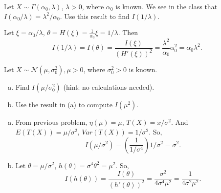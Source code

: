 \begin{ex}
    Let $X\sim \Gamma(\alpha_0, \lambda)$, $\lambda>0$, where $\alpha_0$ is known. We see in the class that $I(\alpha_0/\lambda)=\lambda^2/\alpha_0$. Use this result to find $I(1/\lambda)$. 
\end{ex}

\begin{solution}
    Let $\xi=\alpha_0/\lambda$, $\theta=H(\xi)=\frac{1}{\alpha_0}\xi=1/\lambda$. Then
    \[
        I(1/\lambda)=I(\theta)=\frac{I(\xi)}{(H'(\xi))^2}=\frac{\lambda^2}{\alpha_0}\alpha_0^2=\alpha_0\lambda^2. 
    \]
\end{solution}

\begin{ex}
    Let \(X \sim \mathcal{N}\left(\mu, \sigma_{0}^{2}\right), \mu>0\), where \(\sigma_{0}^{2}>0\) is known. 
    \begin{enumerate}[(a)]
        \item Find \(I\left(\mu / \sigma_{0}^{2}\right)\) (hint: no calculations needed). 
        \item Use the result in (a) to compute \(I\left(\mu^{2}\right)\). 
    \end{enumerate}
\end{ex}

\begin{solution}
    \begin{enumerate}[(a)]
        \item From previous problem, $\eta(\mu)=\mu$, $T(X)=x/\sigma^2$. And $E(T(X))=\mu/\sigma^2$, $Var(T(X))=1/\sigma^2$. So, 
        \[
            I(\mu/\sigma^2)=\left(\frac{1}{1/\sigma^4}\right)1/\sigma^2=\sigma^2. 
        \]
        \item Let $\theta=\mu/\sigma^2$, $h(\theta)=\sigma^4\theta^2=\mu^2$. So, 
        \[
            I(h(\theta))=\frac{I(\theta)}{(h'(\theta))^2}=\frac{\sigma^2}{4\sigma^4\mu^2}=\frac{1}{4\sigma^2\mu^2}. 
        \]
    \end{enumerate}
\end{solution}

